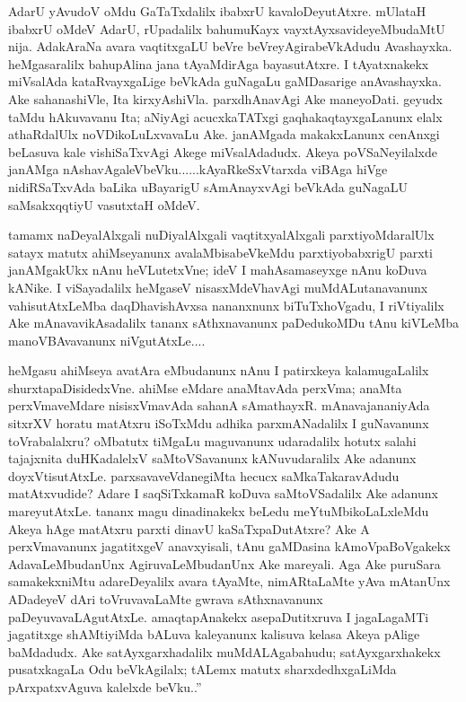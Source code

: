 AdarU yAvudoV oMdu GaTaTxdalilx ibabxrU kavaloDeyutAtxre. mUlataH ibabxrU oMdeV AdarU, rUpadalilx bahumuKayx vayxtAyxsavideyeMbudaMtU nija. AdakAraNa avara vaqtitxgaLU beVre beVreyAgirabeVkAdudu Avashayxka. heMgasaralilx bahupAlina jana tAyaMdirAga bayasutAtxre. I tAyatxnakekx miVsalAda kataRvayxgaLige beVkAda guNagaLu gaMDasarige anAvashayxka. Ake sahanashiVle, Ita kirxyAshiVla. parxdhAnavAgi Ake maneyoDati. geyudx taMdu hAkuvavanu Ita; aNiyAgi acucxkaTATxgi gaqhakaqtayxgaLanunx elalx athaRdalUlx noVDikoLuLxvavaLu Ake. janAMgada makakxLanunx cenAnxgi beLasuva kale vishiSaTxvAgi Akege miVsalAdadudx. Akeya poVSaNeyilalxde janAMga nAshavAgaleVbeVku......kAyaRkeSxVtarxda viBAga hiVge nidiRSaTxvAda baLika uBayarigU sAmAnayxvAgi beVkAda guNagaLU saMsakxqqtiyU vasutxtaH oMdeV.

tamamx naDeyalAlxgali nuDiyalAlxgali vaqtitxyalAlxgali parxtiyoMdaralUlx satayx matutx ahiMseyanunx avalaMbisabeVkeMdu parxtiyobabxrigU parxti janAMgakUkx nAnu heVLutetxVne; ideV I mahAsamaseyxge nAnu koDuva kANike. I viSayadalilx heMgaseV nisasxMdeVhavAgi muMdALutanavanunx vahisutAtxLeMba daqDhavishAvxsa nananxnunx biTuTxhoVgadu, I riVtiyalilx Ake mAnavavikAsadalilx tananx sAthxnavanunx paDedukoMDu tAnu kiVLeMba manoVBAvavanunx niVgutAtxLe....

heMgasu ahiMseya avatAra eMbudanunx nAnu I patirxkeya kalamugaLalilx shurxta\-paDisidedxVne. ahiMse eMdare anaMtavAda perxVma; anaMta perxVmaveMdare nisisxVmavAda sahanA sAmathayxR. mAnavajananiyAda sitxrXV horatu matAtxru iSoTxMdu adhika parxmANadalilx I guNavanunx toVrabalalxru? oMbatutx tiMgaLu maguvanunx udaradalilx hotutx salahi tajajxnita duHKadalelxV saMtoVSavanunx kANuvudaralilx Ake adanunx doyxVtisutAtxLe. parxsavaveVdanegiMta hecucx saMkaTakaravAdudu matAtxvudide? Adare I saqSiTxkamaR koDuva saMtoVSadalilx Ake adanunx mareyutAtxLe. tananx magu dinadinakekx beLedu meYtuMbikoLaLxleMdu Akeya hAge matAtxru parxti dinavU kaSaTxpaDutAtxre? Ake A perxVmavanunx jagatitxgeV anavxyisali, tAnu gaMDasina kAmoVpaBoVgakekx AdavaLeMbudanUnx AgiruvaLeMbudanUnx Ake mareyali. Aga Ake puruSara samakekxniMtu adareDeyalilx avara tAyaMte, nimARtaLaMte yAva mAtanUnx ADadeyeV dAri toVruvavaLaMte gwrava sAthxnavanunx paDeyuvavaLAgutAtxLe. amaqtapAnakekx asepaDutitxruva I jagaLagaMTi jagatitxge shAMtiyiMda bALuva kaleyanunx kalisuva kelasa Akeya pAlige baMdadudx. Ake satAyxgarxhadalilx  muMdALAgabahudu; satAyxgarxhakekx pusatxkagaLa Odu beVkAgilalx; tALemx matutx sharxdedhxgaLiMda pArxpatxvAguva kalelxde beVku..''

